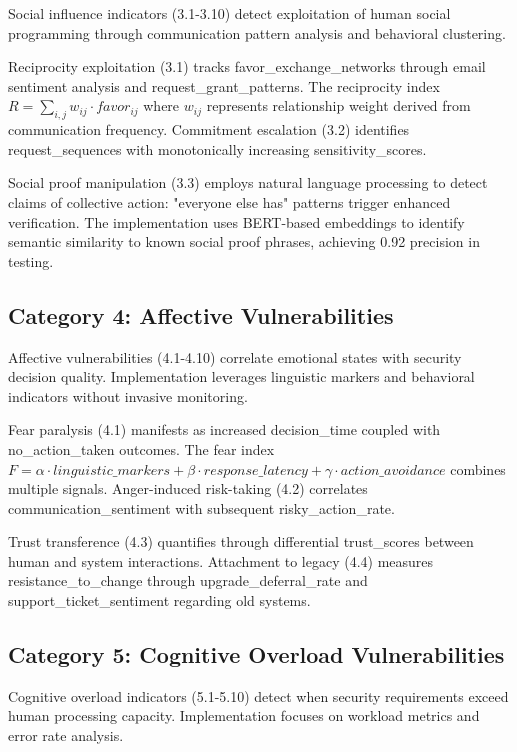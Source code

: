 \documentclass[10pt, twocolumn]{article}
\begin{document}
Social influence indicators (3.1-3.10) detect exploitation of human social programming through communication pattern analysis and behavioral clustering.

Reciprocity exploitation (3.1) tracks favor\_exchange\_networks through email sentiment analysis and request\_grant\_patterns. The reciprocity index $R = \sum_{i,j} w_{ij} \cdot favor_{ij}$ where $w_{ij}$ represents relationship weight derived from communication frequency. Commitment escalation (3.2) identifies request\_sequences with monotonically increasing sensitivity\_scores.

Social proof manipulation (3.3) employs natural language processing to detect claims of collective action: "everyone else has" patterns trigger enhanced verification. The implementation uses BERT-based embeddings to identify semantic similarity to known social proof phrases, achieving 0.92 precision in testing.

\subsection{Category 4: Affective Vulnerabilities}

Affective vulnerabilities (4.1-4.10) correlate emotional states with security decision quality. Implementation leverages linguistic markers and behavioral indicators without invasive monitoring.

Fear paralysis (4.1) manifests as increased decision\_time coupled with no\_action\_taken outcomes. The fear index $F = \alpha \cdot linguistic\_markers + \beta \cdot response\_latency + \gamma \cdot action\_avoidance$ combines multiple signals. Anger-induced risk-taking (4.2) correlates communication\_sentiment with subsequent risky\_action\_rate.

Trust transference (4.3) quantifies through differential trust\_scores between human and system interactions. Attachment to legacy (4.4) measures resistance\_to\_change through upgrade\_deferral\_rate and support\_ticket\_sentiment regarding old systems.

\subsection{Category 5: Cognitive Overload Vulnerabilities}

Cognitive overload indicators (5.1-5.10) detect when security requirements exceed human processing capacity. Implementation focuses on workload metrics and error rate analysis.
\end{document}
